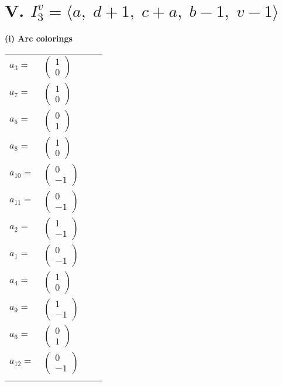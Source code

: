 \documentclass[1p]{elsarticle_modified}
\theoremstyle{definition}
\begin{document}
\centering \section*{V. $I^v_{3}= \langle a,\;d+1,\;c+a,\;b-1,\;v-1 \rangle$}
\flushleft \textbf{(i) Arc colorings}\\
\begin{tabular}{m{7pt} m{180pt} m{7pt} m{180pt} }
\flushright $a_{3}=$&$\begin{pmatrix}1\\0\end{pmatrix}$ \\
\flushright $a_{7}=$&$\begin{pmatrix}1\\0\end{pmatrix}$ \\
\flushright $a_{5}=$&$\begin{pmatrix}0\\1\end{pmatrix}$ \\
\flushright $a_{8}=$&$\begin{pmatrix}1\\0\end{pmatrix}$ \\
\flushright $a_{10}=$&$\begin{pmatrix}0\\-1\end{pmatrix}$ \\
\flushright $a_{11}=$&$\begin{pmatrix}0\\-1\end{pmatrix}$ \\
\flushright $a_{2}=$&$\begin{pmatrix}1\\-1\end{pmatrix}$ \\
\flushright $a_{1}=$&$\begin{pmatrix}0\\-1\end{pmatrix}$ \\
\flushright $a_{4}=$&$\begin{pmatrix}1\\0\end{pmatrix}$ \\
\flushright $a_{9}=$&$\begin{pmatrix}1\\-1\end{pmatrix}$ \\
\flushright $a_{6}=$&$\begin{pmatrix}0\\1\end{pmatrix}$ \\
\flushright $a_{12}=$&$\begin{pmatrix}0\\-1\end{pmatrix}$\\&\end{tabular}
\end{document}
